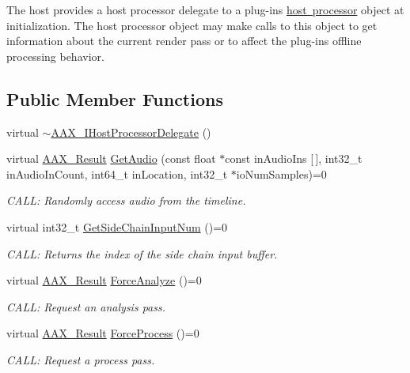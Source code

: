 The host provides a host processor delegate to a plug-\/in\textquotesingle{}s \mbox{\hyperlink{a01833}{host processor}} object at initialization. The host processor object may make calls to this object to get information about the current render pass or to affect the plug-\/in\textquotesingle{}s offline processing behavior. \subsection*{Public Member Functions}
\begin{DoxyCompactItemize}
\item 
virtual \mbox{\hyperlink{a01837_ad3a419f006b4a5dda335d5c3aa0f8d9f}{$\sim$\+A\+A\+X\+\_\+\+I\+Host\+Processor\+Delegate}} ()
\item 
virtual \mbox{\hyperlink{a00392_a4d8f69a697df7f70c3a8e9b8ee130d2f}{A\+A\+X\+\_\+\+Result}} \mbox{\hyperlink{a01837_ae083d877253163dd367f46c7c491e9e3}{Get\+Audio}} (const float $\ast$const in\+Audio\+Ins \mbox{[}$\,$\mbox{]}, int32\+\_\+t in\+Audio\+In\+Count, int64\+\_\+t in\+Location, int32\+\_\+t $\ast$io\+Num\+Samples)=0
\begin{DoxyCompactList}\small\item\em C\+A\+LL\+: Randomly access audio from the timeline. \end{DoxyCompactList}\item 
virtual int32\+\_\+t \mbox{\hyperlink{a01837_aaf6821f08105fd949aa9e78f3a1f7f50}{Get\+Side\+Chain\+Input\+Num}} ()=0
\begin{DoxyCompactList}\small\item\em C\+A\+LL\+: Returns the index of the side chain input buffer. \end{DoxyCompactList}\item 
virtual \mbox{\hyperlink{a00392_a4d8f69a697df7f70c3a8e9b8ee130d2f}{A\+A\+X\+\_\+\+Result}} \mbox{\hyperlink{a01837_a8ab521c8f0902707a8e8d67d7886d4f4}{Force\+Analyze}} ()=0
\begin{DoxyCompactList}\small\item\em C\+A\+LL\+: Request an analysis pass. \end{DoxyCompactList}\item 
virtual \mbox{\hyperlink{a00392_a4d8f69a697df7f70c3a8e9b8ee130d2f}{A\+A\+X\+\_\+\+Result}} \mbox{\hyperlink{a01837_a09793675802a25886bc050cee4b9f843}{Force\+Process}} ()=0
\begin{DoxyCompactList}\small\item\em C\+A\+LL\+: Request a process pass. \end{DoxyCompactList}\end{DoxyCompactItemize}


